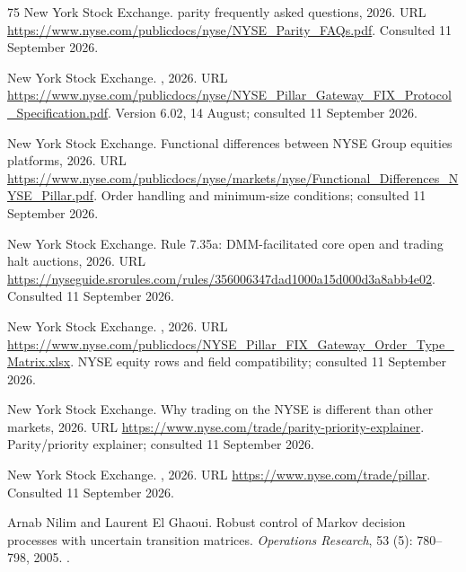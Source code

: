 \documentclass[11pt]{article}
\numberwithin{equation}{section}
\theoremstyle{definition}
\theoremstyle{remark}
\theoremstyle{definition}
\begin{document}
\begin{thebibliography}{75}
{New York Stock Exchange}.
 parity frequently asked questions, 2026{}.
\newblock URL \url{https://www.nyse.com/publicdocs/nyse/NYSE_Parity_FAQs.pdf}.
\newblock Consulted 11 September 2026.

{New York Stock Exchange}.
, 2026{}.
\newblock URL
  \url{https://www.nyse.com/publicdocs/nyse/NYSE_Pillar_Gateway_FIX_Protocol_Specification.pdf}.
\newblock Version 6.02, 14 August; consulted 11 September 2026.

{New York Stock Exchange}.
\newblock Functional differences between {NYSE Group} equities platforms,
  2026{}.
\newblock URL
  \url{https://www.nyse.com/publicdocs/nyse/markets/nyse/Functional_Differences_NYSE_Pillar.pdf}.
\newblock Order handling and minimum-size conditions; consulted 11 September
  2026.

{New York Stock Exchange}.
\newblock Rule 7.35a: {DMM}-facilitated core open and trading halt auctions,
  2026{}.
\newblock URL
  \url{https://nyseguide.srorules.com/rules/356006347dad1000a15d000d3a8abb4e02}.
\newblock Consulted 11 September 2026.

{New York Stock Exchange}.
, 2026{}.
\newblock URL
  \url{https://www.nyse.com/publicdocs/NYSE_Pillar_FIX_Gateway_Order_Type_Matrix.xlsx}.
\newblock NYSE equity rows and field compatibility; consulted 11 September
  2026.

{New York Stock Exchange}.
\newblock Why trading on the {NYSE} is different than other markets,
  2026{}.
\newblock URL \url{https://www.nyse.com/trade/parity-priority-explainer}.
\newblock Parity/priority explainer; consulted 11 September 2026.

{New York Stock Exchange}.
, 2026{}.
\newblock URL \url{https://www.nyse.com/trade/pillar}.
\newblock Consulted 11 September 2026.

Arnab Nilim and Laurent {El Ghaoui}.
\newblock Robust control of {Markov} decision processes with uncertain
  transition matrices.
\newblock \emph{Operations Research}, 53 (5):
  780--798, 2005.
\newblock {}.


\end{thebibliography}
\end{document}
